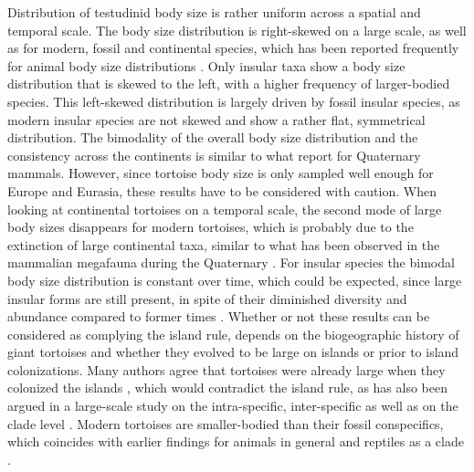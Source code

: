 Distribution of testudinid body size is rather uniform across a spatial and temporal scale.
The body size distribution is right-skewed on a large scale, as well as for modern, fossil and continental species, which has been reported frequently for animal body size distributions \citep{Blackburn1994,Kozlowski2002}.
Only insular taxa show a body size distribution that is skewed to the left, with a higher frequency of larger-bodied species. This left-skewed distribution is largely driven by fossil insular species, as modern insular species are not skewed and show a rather flat, symmetrical distribution.
The bimodality of the overall body size distribution and the consistency across the continents is similar to what \cite{Lyons2008} report for Quaternary mammals. However, since tortoise body size is only sampled well enough for Europe and Eurasia, these results have to be considered with caution.
When looking at continental tortoises on a temporal scale, the second mode of large body sizes disappears for modern tortoises, which is probably due to the extinction of large continental taxa, similar to what has been observed in the mammalian megafauna during the Quaternary \citep{Lyons2008}. For insular species the bimodal body size distribution is constant over time, which could be expected, since large insular forms are still present, in spite of their diminished diversity and abundance compared to former times \citep{Rhodin2015}.
Whether or not these results can be considered as complying the island rule, depends on the biogeographic history of giant tortoises and whether they evolved to be large on islands or prior to island colonizations. Many authors agree that tortoises were already large when they colonized the islands \citep{Itescu2014,Cheke2016, Gerlach2006,Caccone1999}, which would contradict the island rule, as has also been argued in a large-scale study on the intra-specific, inter-specific as well as on the clade level \citep{Itescu2014}. 
Modern tortoises are smaller-bodied than their fossil conspecifics, which coincides with earlier findings for animals in general \citep{Blackburn1994} and reptiles as a clade \citep{Smith2016}.








